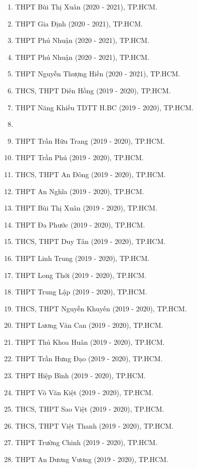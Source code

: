 \whiteBGstarBegin
\setcounter{section}{0}
\begin{enumerate}[label=\bfseries  \arabic*.]
	\item THPT Bùi Thị Xuân (2020 - 2021), TP.HCM.
	\item THPT Gia Định (2020 - 2021), TP.HCM.
	\item THPT Phú Nhuận (2020 - 2021), TP.HCM.
	\item THPT Phú Nhuận (2020 - 2021), TP.HCM.
	\item THPT Nguyễn Thượng Hiền (2020 - 2021), TP.HCM.
	\item THCS, THPT Diên Hồng (2019 - 2020), TP.HCM.
	\item THPT Năng Khiếu TDTT H.BC (2019 - 2020), TP.HCM.
	\item 
	\item THPT Trần Hữu Trang (2019 - 2020), TP.HCM.
	\item THPT Trần Phú (2019 - 2020), TP.HCM.
	\item THCS, THPT An Đông (2019 - 2020), TP.HCM.
	\item THPT An Nghĩa (2019 - 2020), TP.HCM.
	\item THPT Bùi Thị Xuân (2019 - 2020), TP.HCM.
	\item THPT Đa Phước (2019 - 2020), TP.HCM.
	\item THCS, THPT Duy Tân (2019 - 2020), TP.HCM.
	\item THPT Linh Trung (2019 - 2020), TP.HCM.
	\item THPT Long Thới (2019 - 2020), TP.HCM.
	\item THPT Trung Lập (2019 - 2020), TP.HCM.
	\item THCS, THPT Nguyễn Khuyến (2019 - 2020), TP.HCM.
	\item THPT Lương Văn Can (2019 - 2020), TP.HCM.
	\item THPT Thủ Khoa Huân (2019 - 2020), TP.HCM.
	\item THPT Trần Hưng Đạo (2019 - 2020), TP.HCM.
	\item THPT Hiệp Bình (2019 - 2020), TP.HCM.
	\item THPT Võ Văn Kiệt (2019 - 2020), TP.HCM.
	\item THCS, THPT Sao Việt (2019 - 2020), TP.HCM.
	\item THCS, THPT Việt Thanh (2019 - 2020), TP.HCM.
	\item THPT Trường Chinh (2019 - 2020), TP.HCM.
	\item THPT An Dương Vương (2019 - 2020), TP.HCM.

\end{enumerate}
